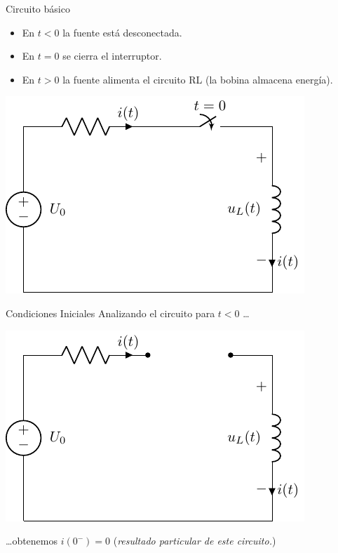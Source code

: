 \documentclass[aspectratio=169, usenames,svgnames,dvipsnames]{beamer}
\begin{document}
\begin{frame}[label={sec:orgfacd0a0}]{Circuito básico}
\begin{itemize}
\item En \(t < 0\) la fuente está desconectada.
\item En \(t = 0\) se cierra el interruptor.
\item En \(t > 0\) la fuente alimenta el circuito RL (la bobina almacena energía).
\end{itemize}

\begin{center}
\includegraphics[height=0.55\textheight]{../figs/transitorio_circuitoRL.pdf}
\end{center}
\end{frame}
\begin{frame}[label={sec:org8546373}]{Condiciones Iniciales}
Analizando el circuito para \(t < 0\) \ldots{}
\begin{center}
\includegraphics[height=0.45\textheight]{../figs/transitorio_circuitoRL_t0-.pdf}
\end{center}
\ldots{}obtenemos  \(i(0^-) = 0\) (\emph{resultado particular de este circuito.})
\end{frame}
\end{document}
